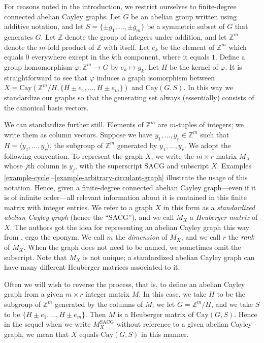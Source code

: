 \documentclass{article}
\renewcommand{\phi}{\varphi}
\theoremstyle{definition}
\theoremstyle{remark}
\begin{document}
For reasons noted in the introduction, we restrict ourselves to finite-degree connected abelian Cayley graphs.  Let $G$ be an abelian group written using additive notation, and let $S=\{\pm g_1,\dots,\pm g_m\}$ be a symmetric subset of $G$ that generates $G$.  Let $\mathbb{Z}$ denote the group of integers under addition, and let $\mathbb{Z}^m$ denote the $m$-fold product of $\mathbb{Z}$ with itself.
Let $e_k$ be the element of $\mathbb{Z}^m$ which equals $0$ everywhere except in the $k$th component, where it equals $1$.  Define a group homomorphism $\phi\colon\mathbb{Z}^m\to G$ by $e_k\mapsto g_k$.  Let $H$ be the kernel of $\phi$.  It is straightforward to see that $\phi$ induces a graph isomorphism between $X=\text{Cay}(\mathbb{Z}^m/H,\{H\pm e_1,\dots,H\pm e_m\})$ and $\text{Cay}(G,S)$.  In this way we standardize our graphs so that the generating set always (essentially) consists of the canonical basis vectors.

We can standardize further still.  Elements of $\mathbb{Z}^m$ are $m$-tuples of integers; we write them as column vectors.  Suppose we have $y_1,\dots,y_r\in \mathbb{Z}^m$ such that $H=\langle y_1,\dots,y_r \rangle$, the subgroup of $\mathbb{Z}^m$ generated by $y_1,\dots,y_r$.  We adopt the following convention.  To represent the graph $X$, we write the $m\times r$ matrix $M_X$ whose $j$th column is $y_j$, with the superscript $\text{SACG}$ and subscript $X$.  Examples \ref{example-cycle}--\ref{example-arbitrary-circulant-graph} illustrate the usage of this notation.  Hence, given a finite-degree connected abelian Cayley graph---even if it is of infinite order---all relevant information about it is contained in this finite matrix with integer entries.  We refer to a graph $X$ in this form as a \emph{standardized abelian Cayley graph} (hence the ``SACG''), and we call $M_X$ a \emph{Heuberger matrix} of $X$.  The authors got the idea for representing an abelian Cayley graph this way from \cite{Heuberger}, ergo the eponym.  We call $m$ the \emph{dimension} of $M_X$, and we call $r$ the $\emph{rank}$ of $M_X$.  When the graph does not need to be named, we sometimes omit the subscript.  Note that $M_X$ is not unique; a standardized abelian Cayley graph can have many different Heuberger matrices associated to it.

Often we will wish to reverse the process, that is, to define an abelian Cayley graph from a given $m\times r$ integer matrix $M$.  In this case, we take $H$ to be the subgroup of $\mathbb{Z}^m$ generated by the columns of $M$; we let $G=\mathbb{Z}^m/H$, and we take $S$ to be $\{H\pm e_1,\dots,H\pm e_m\}$.  Then $M$ is a Heuberger matrix of $\text{Cay}(G,S)$.  Hence in the sequel when we write $M_X^\text{SACG}$ without reference to a given abelian Cayley graph, we mean that $X$ equals $\text{Cay}(G,S)$ in this manner.
\end{document}
